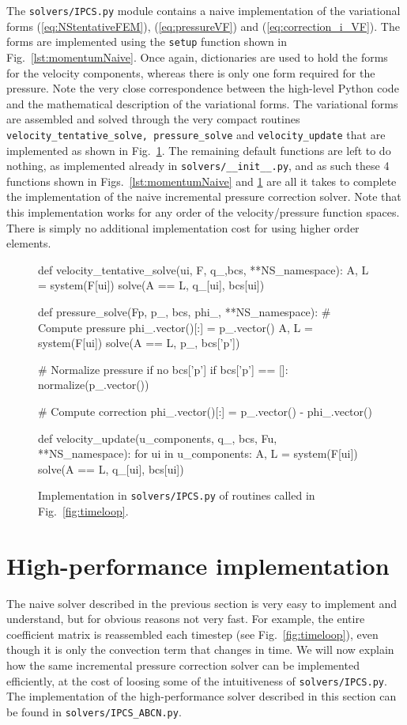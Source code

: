 \documentclass[final,3p,times,twocolumn]{elsarticle}
\newcommand{\inpyth}{\lstinline[style=inlinestyle]} %[]%
\begin{document}
The \inpyth{solvers/IPCS.py} module contains a naive implementation of the variational forms (\ref{eq:NStentativeFEM}), (\ref{eq:pressureVF}) and (\ref{eq:correction_i_VF}). The forms are implemented using the \inpyth{setup} function shown in Fig.~\ref{lst:momentumNaive}. Once again, dictionaries are used to hold the forms for the velocity components, whereas there is only one form required for the pressure. Note the very close correspondence between the high-level Python code and the mathematical description of the variational forms. The variational forms are assembled and solved through the very compact routines \inpyth{velocity_tentative_solve, pressure_solve} and \inpyth{velocity_update} that are implemented as shown in Fig.~\ref{fig:ipcs_solve}. The remaining default functions are left to do nothing, as implemented already in \inpyth{solvers/__init__.py}, and as such these 4 functions shown in Figs.~\ref{lst:momentumNaive} and \ref{fig:ipcs_solve} are all it takes to complete the implementation of the naive incremental pressure correction solver. Note that this implementation works for any order of the velocity/pressure function spaces. There is simply no additional implementation cost for using higher order elements.
\begin{figure}[ht!]
\begin{python}
def velocity_tentative_solve(ui, F, q_,bcs,
                           **NS_namespace):
  A, L = system(F[ui])
  solve(A == L, q_[ui], bcs[ui])

def pressure_solve(Fp, p_, bcs, phi_,
                   **NS_namespace):
  # Compute pressure
  phi_.vector()[:] = p_.vector()
  A, L = system(F[ui])
  solve(A == L, p_, bcs['p'])

  # Normalize pressure if no bcs['p']
  if bcs['p'] == []:
    normalize(p_.vector())

  # Compute correction
  phi_.vector()[:] = p_.vector() - phi_.vector()

def velocity_update(u_components, q_, bcs,
                    Fu, **NS_namespace):
  for ui in u_components:
    A, L = system(F[ui])
    solve(A == L, q_[ui], bcs[ui])

\end{python}
\caption{Implementation in \inpyth{solvers/IPCS.py} of routines called in Fig.~\ref{fig:timeloop}.}
\label{fig:ipcs_solve}
\end{figure}

\section{High-performance implementation}
\label{sec:hpc}
The naive solver described in the previous section is very easy to implement and understand, but for obvious reasons not very fast. For example, the entire coefficient matrix is reassembled each timestep (see Fig.~\ref{fig:timeloop}), even though it is only the convection term that changes in time. We will now explain how the same incremental pressure correction solver can be implemented efficiently, at the cost of loosing some of the intuitiveness of \inpyth{solvers/IPCS.py}. The implementation of the high-performance solver described in this section can be found in \inpyth{solvers/IPCS_ABCN.py}.
\end{document}

